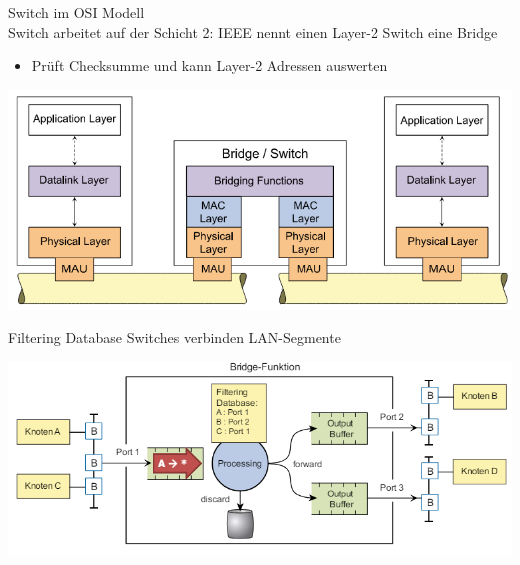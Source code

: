 \begin{definition}{Switch im OSI Modell}\\
    Switch arbeitet auf der Schicht 2: IEEE nennt einen Layer-2 Switch eine Bridge
    \begin{itemize}
        \item Prüft Checksumme und kann Layer-2 Adressen auswerten
    \end{itemize}
    \begin{center}
        \includegraphics[width=0.8\linewidth]{images/switch_osimodell.png}
    \end{center}
\end{definition}

\begin{definition}{Filtering Database}
    Switches verbinden LAN-Segmente\\
    \begin{centering}
        \includegraphics[width=1\linewidth]{images/filtering_database.png}    
    \end{centering}
\end{definition}

